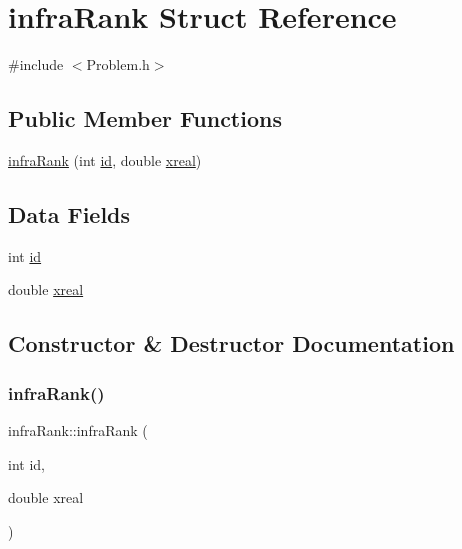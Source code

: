 \hypertarget{structinfraRank}{}\section{infra\+Rank Struct Reference}
\label{structinfraRank}


{\ttfamily \#include $<$Problem.\+h$>$}

\subsection*{Public Member Functions}
\begin{DoxyCompactItemize}
\item 
\mbox{\hyperlink{structinfraRank_aa50dcfdcee689bd1484c9ac2b09bc694_aa50dcfdcee689bd1484c9ac2b09bc694}{infra\+Rank}} (int \mbox{\hyperlink{structinfraRank_ace3640f7fdc691b68111cf07e0eabaae_ace3640f7fdc691b68111cf07e0eabaae}{id}}, double \mbox{\hyperlink{structinfraRank_a1bb966369809456d65bd4e2d4e19d775_a1bb966369809456d65bd4e2d4e19d775}{xreal}})
\end{DoxyCompactItemize}
\subsection*{Data Fields}
\begin{DoxyCompactItemize}
\item 
int \mbox{\hyperlink{structinfraRank_ace3640f7fdc691b68111cf07e0eabaae_ace3640f7fdc691b68111cf07e0eabaae}{id}}
\item 
double \mbox{\hyperlink{structinfraRank_a1bb966369809456d65bd4e2d4e19d775_a1bb966369809456d65bd4e2d4e19d775}{xreal}}
\end{DoxyCompactItemize}


\subsection{Constructor \& Destructor Documentation}
\mbox{\label{structinfraRank_aa50dcfdcee689bd1484c9ac2b09bc694_aa50dcfdcee689bd1484c9ac2b09bc694}} 
\subsubsection{\texorpdfstring{infra\+Rank()}{infraRank()}}
{\footnotesize\ttfamily infra\+Rank\+::infra\+Rank (\begin{DoxyParamCaption}\item[{int}]{id,  }\item[{double}]{xreal }\end{DoxyParamCaption})\hspace{0.3cm}{\ttfamily [inline]}}



